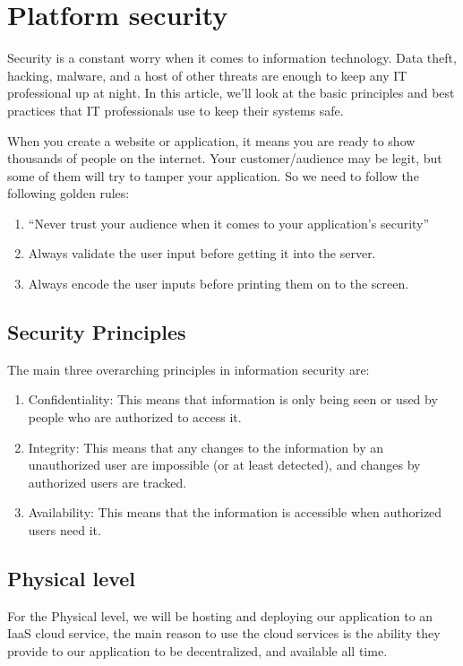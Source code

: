 \section{Platform security}
Security is a constant worry when it comes to information technology. Data theft, hacking, malware, and a host of other threats are enough to keep any IT professional up at night. In this article, we’ll look at the basic principles and best practices that IT professionals use to keep their systems safe.

When you create a website or application, it means you are ready to show thousands of people on the internet. Your customer/audience may be legit, but some of them will try to tamper your application. So we need to follow the following golden rules:
\begin{enumerate}
      \item 
      “Never trust your audience when it comes to your application’s security”
      \item 
      Always validate the user input before getting it into the server.
      \item 
      Always encode the user inputs before printing them on to the screen.
\end{enumerate}

\subsection{Security Principles}
The main three overarching principles in information security are:
\begin{enumerate}
      \item 
      Confidentiality: This means that information is only being seen or used by people who are authorized to access it.
      \item 
      Integrity: This means that any changes to the information by an unauthorized user are impossible (or at least detected), and changes by authorized users are tracked.
      \item 
      Availability: This means that the information is accessible when authorized users need it.
\end{enumerate}

\subsection{Physical level}
For the Physical level, we will be hosting and deploying our application to an IaaS cloud service, the main reason to use the cloud services is the ability they provide to our application to be decentralized, and available all time.

